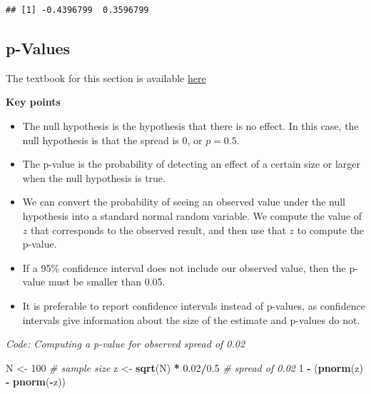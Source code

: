 \documentclass[
]{article}
\newenvironment{Shaded}{\begin{snugshade}}{\end{snugshade}}
\newcommand{\CommentTok}[1]{\textcolor[rgb]{0.56,0.35,0.01}{\textit{#1}}}
\newcommand{\DecValTok}[1]{\textcolor[rgb]{0.00,0.00,0.81}{#1}}
\newcommand{\FloatTok}[1]{\textcolor[rgb]{0.00,0.00,0.81}{#1}}
\newcommand{\KeywordTok}[1]{\textcolor[rgb]{0.13,0.29,0.53}{\textbf{#1}}}
\newcommand{\NormalTok}[1]{#1}
\newcommand{\OperatorTok}[1]{\textcolor[rgb]{0.81,0.36,0.00}{\textbf{#1}}}
\newcommand{\StringTok}[1]{\textcolor[rgb]{0.31,0.60,0.02}{#1}}
\providecommand{\tightlist}{%
  \setlength{\itemsep}{0pt}\setlength{\parskip}{0pt}}
\begin{document}
\begin{verbatim}
## [1] -0.4396799  0.3596799
\end{verbatim}

\hypertarget{p-values}{%
\subsection{p-Values}\label{p-values}}

The textbook for this section is available
\href{https://rafalab.github.io/dsbook/inference.html\#p-values}{here}

\textbf{Key points}

\begin{itemize}
\tightlist
\item
  The null hypothesis is the hypothesis that there is no effect. In this
  case, the null hypothesis is that the spread is 0, or \(p = 0.5\).
\item
  The p-value is the probability of detecting an effect of a certain
  size or larger when the null hypothesis is true.
\item
  We can convert the probability of seeing an observed value under the
  null hypothesis into a standard normal random variable. We compute the
  value of \(z\) that corresponds to the observed result, and then use
  that \(z\) to compute the p-value.
\item
  If a 95\% confidence interval does not include our observed value,
  then the p-value must be smaller than 0.05.
\item
  It is preferable to report confidence intervals instead of p-values,
  as confidence intervals give information about the size of the
  estimate and p-values do not.
\end{itemize}

\emph{Code: Computing a p-value for observed spread of 0.02}

\begin{Shaded}
\begin{Highlighting}[]
\NormalTok{N \textless{}{-}}\StringTok{ }\DecValTok{100}    \CommentTok{\# sample size}
\NormalTok{z \textless{}{-}}\StringTok{ }\KeywordTok{sqrt}\NormalTok{(N) }\OperatorTok{*}\StringTok{ }\FloatTok{0.02}\OperatorTok{/}\FloatTok{0.5}    \CommentTok{\# spread of 0.02}
\DecValTok{1} \OperatorTok{{-}}\StringTok{ }\NormalTok{(}\KeywordTok{pnorm}\NormalTok{(z) }\OperatorTok{{-}}\StringTok{ }\KeywordTok{pnorm}\NormalTok{(}\OperatorTok{{-}}\NormalTok{z))}
\end{Highlighting}
\end{Shaded}
\end{document}
